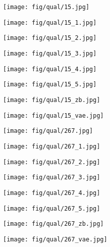 \documentclass[10pt,twocolumn,letterpaper]{article}
\newcommand{\sze}{0.13}
\newcommand{\szle}{0.08}
\begin{document}
\begin{figure*}
\begin{subfigure}[c]{\sze\linewidth}
\texttt{[image: fig/qual/15.jpg]}
\end{subfigure}
\begin{subfigure}[c]{\sze\linewidth}
\texttt{[image: fig/qual/15\_1.jpg]}
\end{subfigure}
\begin{subfigure}[c]{\sze\linewidth}
\texttt{[image: fig/qual/15\_2.jpg]}
\end{subfigure}
\begin{subfigure}[c]{\sze\linewidth}
\texttt{[image: fig/qual/15\_3.jpg]}
\end{subfigure}
\begin{subfigure}[c]{\sze\linewidth}
\texttt{[image: fig/qual/15\_4.jpg]}
\end{subfigure}
\hspace{3pt}
\begin{subfigure}[c]{\sze\linewidth}
\texttt{[image: fig/qual/15\_5.jpg]}
\end{subfigure}
\begin{subfigure}[c]{\szle\linewidth}
\texttt{[image: fig/qual/15\_zb.jpg]}
\end{subfigure}
\hspace{3pt}
\begin{subfigure}[c]{\szle\linewidth}
\texttt{[image: fig/qual/15\_vae.jpg]}
\end{subfigure}

\begin{subfigure}[c]{\sze\linewidth}
\texttt{[image: fig/qual/267.jpg]}
\end{subfigure}
\begin{subfigure}[c]{\sze\linewidth}
\texttt{[image: fig/qual/267\_1.jpg]}
\end{subfigure}
\begin{subfigure}[c]{\sze\linewidth}
\texttt{[image: fig/qual/267\_2.jpg]}
\end{subfigure}
\begin{subfigure}[c]{\sze\linewidth}
\texttt{[image: fig/qual/267\_3.jpg]}
\end{subfigure}
\begin{subfigure}[c]{\sze\linewidth}
\texttt{[image: fig/qual/267\_4.jpg]}
\end{subfigure}
\hspace{3pt}
\begin{subfigure}[c]{\sze\linewidth}
\texttt{[image: fig/qual/267\_5.jpg]}
\end{subfigure}
\begin{subfigure}[c]{\szle\linewidth}
\texttt{[image: fig/qual/267\_zb.jpg]}
\end{subfigure}
\hspace{3pt}
\begin{subfigure}[c]{\szle\linewidth}
\texttt{[image: fig/qual/267\_vae.jpg]}
\end{subfigure}



\end{figure*}
\end{document}
